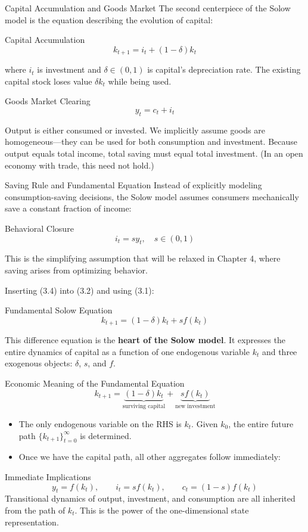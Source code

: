\documentclass[aspectratio=169,10pt]{beamer}
\newcommand{\apxbutton}[1]{\hfill\hyperlink{#1}{\beamerbutton{Appendix}}}
\begin{document}
\begin{frame}{Capital Accumulation and Goods Market}
The second centerpiece of the Solow model is the equation describing the evolution of capital:
\begin{block}{Capital Accumulation}
\[
k_{t+1} = i_t + (1-\delta)k_t \tag{3.2}
\]
\end{block}
where $i_t$ is investment and $\delta \in (0,1)$ is capital's depreciation rate. The existing capital stock loses value $\delta k_t$ while being used.

\begin{block}{Goods Market Clearing}
\[
y_t = c_t + i_t \tag{3.3}
\]
\end{block}
Output is either consumed or invested. We implicitly assume goods are homogeneous---they can be used for both consumption and investment. Because output equals total income, total saving must equal total investment. (In an open economy with trade, this need not hold.)
\end{frame}

\begin{frame}{Saving Rule and Fundamental Equation}
\hypertarget{m-a2}{}
Instead of explicitly modeling consumption-saving decisions, the Solow model assumes consumers mechanically save a constant fraction of income:
\begin{block}{Behavioral Closure}
\[
i_t = s y_t, \quad s \in (0,1) \tag{3.4}
\]
\end{block}
This is the simplifying assumption that will be relaxed in Chapter 4, where saving arises from optimizing behavior.

\medskip
Inserting (3.4) into (3.2) and using (3.1):
\begin{block}{Fundamental Solow Equation}
\[
k_{t+1} = (1-\delta)k_t + s f(k_t) \tag{3.5}
\]
\end{block}
This difference equation is the \textbf{heart of the Solow model}. It expresses the entire dynamics of capital as a function of one endogenous variable $k_t$ and three exogenous objects: $\delta$, $s$, and $f$.
\apxbutton{a2}
\end{frame}

\begin{frame}{Economic Meaning of the Fundamental Equation}
\[
k_{t+1} = \underbrace{(1-\delta)k_t}_{\text{surviving capital}} + \underbrace{s f(k_t)}_{\text{new investment}}
\]

\begin{itemize}
  \item The only endogenous variable on the RHS is $k_t$. Given $k_0$, the entire future path $\{k_{t+1}\}_{t=0}^{\infty}$ is determined.
  \item Once we have the capital path, all other aggregates follow immediately:
\end{itemize}
\begin{block}{Immediate Implications}
\[
y_t=f(k_t),\qquad i_t=s f(k_t),\qquad c_t=(1-s)f(k_t)
\]
Transitional dynamics of output, investment, and consumption are all inherited from the path of $k_t$. This is the power of the one-dimensional state representation.
\end{block}
\end{frame}
\end{document}
